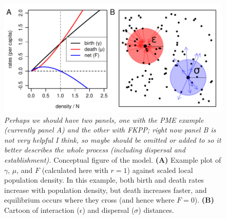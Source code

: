 \documentclass[12pt]{article}
\newcommand{\comment}[1]{{\color{blue} \it #1}}
\begin{document}
\begin{figure}
    \begin{center}
        \includegraphics{figures/conceptual_figure}
    \end{center}
    \caption{
        \comment{Perhaps we should have two panels, one with the PME example (currently panel A) and the other with FKPP;
        right now panel B is not very helpful I think, so maybe should be omitted or added to so it better describes the whole process
        (including dispersal and establishment).}
        Conceptual figure of the model.
        \textbf{(A)} Example plot of $\gamma$, $\mu$, and $F$
        (calculated here with $r=1$) against scaled local population density.
        In this example, both birth and death rates increase with population density,
        but death increases faster,
        and equilibrium occurs where they cross
        (and hence where $F=0$).
        \textbf{(B)} Cartoon of interaction ($\epsilon$) and dispersal ($\sigma$) distances.
        \label{fig:model_setup}
    }
\end{figure}
\end{document}
